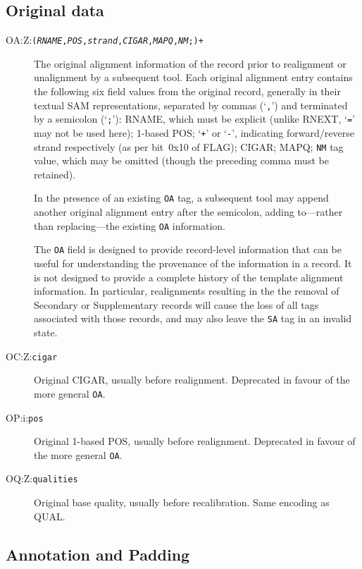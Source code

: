 \documentclass[10pt]{article}
\newcommand{\tagvalue}[1]{{\tt #1}}
\newcommand{\tagregex}[1]{{\tt #1}}
\newcommand{\metavar}[1]{{\rm\emph{#1}}}
\begin{document}
\subsection{Original data}

\begin{description}
\item[OA:Z:\tagregex{(\metavar{RNAME},\metavar{POS},\metavar{strand},\metavar{CIGAR},\metavar{MAPQ},\metavar{NM};)+}]
The original alignment information of the record prior to realignment or unalignment by a subsequent tool.
Each original alignment entry contains the following six field values from the original record, generally in their textual SAM representations, separated by commas (`{\tt ,}') and terminated by a semicolon (`{\tt ;}'):
{\sf RNAME}, which must be explicit (unlike {\sf RNEXT}, `{\tt =}' may not be used here);
1-based {\sf POS};
`{\tt +}' or `{\tt -}', indicating forward/reverse strand respectively (as per bit~0x10 of {\sf FLAG});
{\sf CIGAR};
{\sf MAPQ};
{\tt NM} tag value, which may be omitted (though the preceding comma must be retained).

In the presence of an existing {\tt OA} tag, a subsequent tool may append another original alignment entry after the semicolon,
adding to---rather than replacing---the existing {\tt OA} information.

The {\tt OA} field is designed to provide record-level information that can be useful for understanding the provenance of the information in a record.
It is not designed to provide a complete history of the template alignment information.
In particular, realignments resulting in the the removal of Secondary or Supplementary records will cause the loss of all tags associated with those records, and may also leave the {\tt SA} tag in an invalid state.

\item[OC:Z:\tagvalue{cigar}]
Original CIGAR, usually before realignment.
Deprecated in favour of the more general {\tt OA}.

\item[OP:i:\tagvalue{pos}]
Original 1-based {\sf POS}, usually before realignment.
Deprecated in favour of the more general {\tt OA}.

\item[OQ:Z:\tagvalue{qualities}]
Original base quality, usually before recalibration.
Same encoding as {\sf QUAL}.
\end{description}

\subsection{Annotation and Padding}
\end{document}
